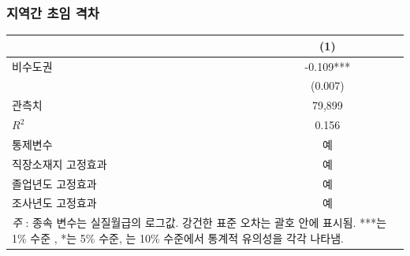 \documentclass[aspectratio=169,xcolor=dvipsnames,handout]{beamer}
\begin{document}
\begin{frame}
    \frametitle{지역간 초임 격차}
    \begin{table}[ht]
        \centering
        \tiny
        \begin{tabular}{lc}
        \toprule
        & \textbf{(1)} \\
        \midrule
        비수도권                    & -0.109***    \\
                                     & (0.007)      \\
        \midrule
        관측치                 & 79,899       \\
        $R^2$                    & 0.156        \\
        통제변수                     & 예          \\
        직장소재지 고정효과 & 예          \\
        졸업년도 고정효과 & 예          \\
        조사년도 고정효과 & 예          \\
        \bottomrule
        \multicolumn{2}{p{6cm}}{\tiny\textit{주} : 종속 변수는 실질월급의 로그값. 강건한 표준 오차는 괄호 안에 표시됨. ***는 1\% 수준 , *는 5\% 수준, 는 10\% 수준에서 통계적 유의성을 각각 나타냄.} \\
        \end{tabular}
    \end{table}
\end{frame}
\end{document}
